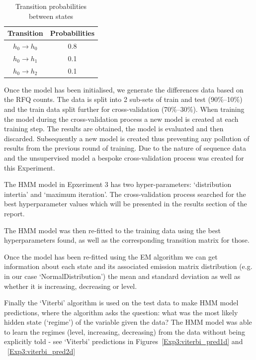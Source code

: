 \begin{table}[!ht]\centering\small
    \caption{Transition probabilities between states}\label{Ch7Tab3}
    \begin{tabular}{cc}
        \toprule
        \bfseries Transition & \bfseries Probabilities \\
        \midrule
        $h_0 \rightarrow h_0$ & 0.8 \\
        $h_0 \rightarrow h_1$ & 0.1 \\
        $h_0 \rightarrow h_2$ & 0.1 \\
        \bottomrule
    \end{tabular}
\end{table}

Once the model has been initialised, we generate the differences data based on the RFQ counts. The data is split into 2 sub-sets of train and test (90\%--10\%) and the train data split further for cross-validation (70\%--30\%). When training the model during the cross-validation process a new model is created at each training step. The results are obtained, the model is evaluated and then discarded. Subsequently a new model is created thus preventing any pollution of results from the previous round of training. Due to the nature of sequence data and the unsupervised model a bespoke cross-validation process was created for this Experiment.

The HMM model in Epxeriment 3 has two hyper-parameters: `distribution intertia' and `maximum iteration'. The cross-validation process searched for the best hyperparameter values which will be presented in the results section of the report. 

The HMM model was then re-fitted to the training data using the best hyperparameters found, as well as the corresponding transition matrix for those.

Once the model has been re-fitted using the EM algorithm we can get information about each state and its associated emission matrix distribution (e.g. in our case `NormalDistribution') the mean and standard deviation as well as whether it is increasing, decreasing or level.

Finally the `Viterbi' algorithm is used on the test data to make HMM model predictions, where the algorithm asks the question: what was the most likely hidden state (`regime') of the variable given the data? The HMM model was able to learn the regimes (level, increasing, decreasing) from the data without being explicitly told - see `Viterbi' predictions in Figures~\ref{Exp3:viterbi_pred1d} and ~\ref{Exp3:viterbi_pred2d}

